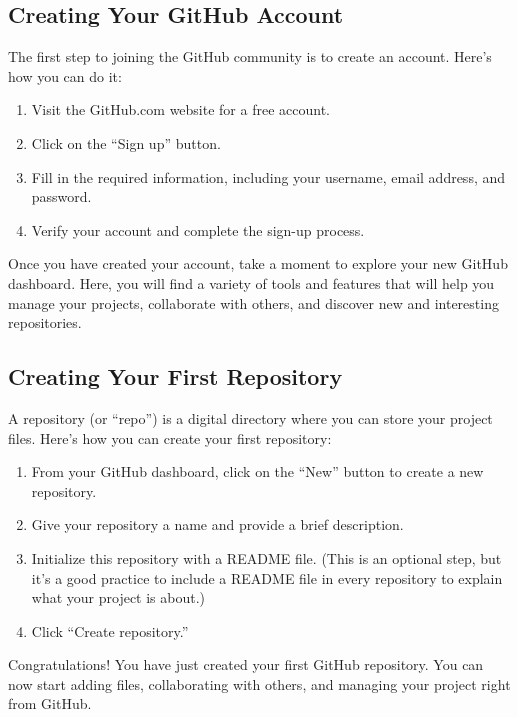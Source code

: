 \documentclass{book}
\begin{document}
\subsection*{Creating Your GitHub Account}

The first step to joining the GitHub community is to create an account. Here’s how you can do it:

\begin{enumerate}
    \item Visit the GitHub.com website for a free account.
    \item Click on the “Sign up” button.
    \item Fill in the required information, including your username, email address, and password.
    \item Verify your account and complete the sign-up process.
\end{enumerate}

Once you have created your account, take a moment to explore your new GitHub dashboard. Here, you will find a variety of tools and features that will help you manage your projects, collaborate with others, and discover new and interesting repositories.

\subsection*{Creating Your First Repository}

A repository (or “repo”) is a digital directory where you can store your project files. Here’s how you can create your first repository:

\begin{enumerate}
    \item From your GitHub dashboard, click on the “New” button to create a new repository.
    \item Give your repository a name and provide a brief description.
    \item Initialize this repository with a README file. (This is an optional step, but it’s a good practice to include a README file in every repository to explain what your project is about.)
    \item Click “Create repository.”
\end{enumerate}

Congratulations! You have just created your first GitHub repository. You can now start adding files, collaborating with others, and managing your project right from GitHub.
\end{document}
